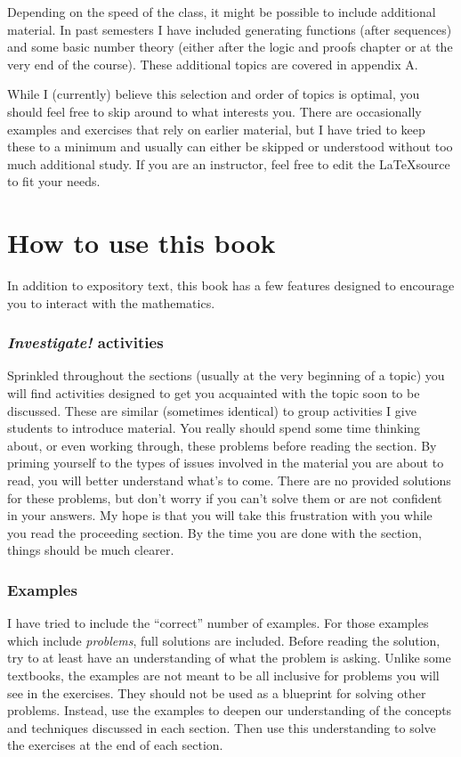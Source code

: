 Depending on the speed of the class, it might be possible to include additional material.  In past semesters I have included generating functions (after sequences) and some basic number theory (either after the logic and proofs chapter or at the very end of the course).  These additional topics are covered in appendix A.

While I (currently) believe this selection and order of topics is optimal, you should feel free to skip around to what interests you.  There are occasionally examples and exercises that rely on earlier material, but I have tried to keep these to a minimum and usually can either be skipped or understood without too much additional study.  If you are an instructor, feel free to edit the \LaTeX source to fit your needs.


\section*{How to use this book}

In addition to expository text, this book has a few features designed to encourage you to interact with the mathematics.

\subsubsection*{\textit{Investigate!} activities}  Sprinkled throughout the sections (usually at the very beginning of a topic) you will find activities designed to get you acquainted with the topic soon to be discussed.  These are similar (sometimes identical) to group activities I give students to introduce material.  You really should spend some time thinking about, or even working through, these problems before reading the section.  By priming yourself to the types of issues involved in the material you are about to read, you will better understand what's to come.  There are no provided solutions for these problems, but don't worry if you can't solve them or are not confident in your answers.  My hope is that you will take this frustration with you while you read the proceeding section.  By the time you are done with the section, things should be much clearer.

\subsubsection*{Examples}

I have tried to include the ``correct'' number of examples.  For those examples which include \emph{problems}, full solutions are included. Before reading the solution, try to at least have an understanding of what the problem is asking.  Unlike some textbooks, the examples are not meant to be all inclusive for problems you will see in the exercises.  They should not be used as a blueprint for solving other problems.  Instead, use the examples to deepen our understanding of the concepts and techniques discussed in each section.  Then use this understanding to solve the exercises at the end of each section.

